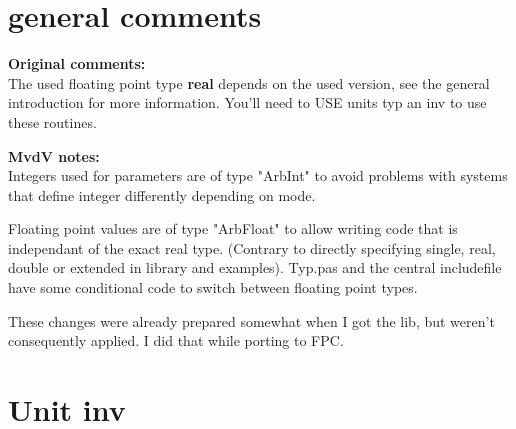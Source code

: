 \documentclass{report}
\begin{document}
\section{general comments}

\textbf{Original comments:} \\ 
The used floating point type \textbf{real} depends on the used version,
see the general introduction for more information. You'll need to USE
units typ an inv to use these routines. 

\textbf{MvdV notes:} \\
Integers used for parameters are of type "ArbInt" to avoid problems with
systems that define integer differently depending on mode. 

Floating point values are of type "ArbFloat" to allow writing code that is
independant of the exact real type. (Contrary to directly specifying single,
real, double or extended in library and examples). Typ.pas and the central
includefile have some conditional code to switch between floating point
types.

These changes were already prepared somewhat when I got the lib, but weren't
consequently applied. I did that while porting to FPC.

\section{Unit inv}
\end{document}
